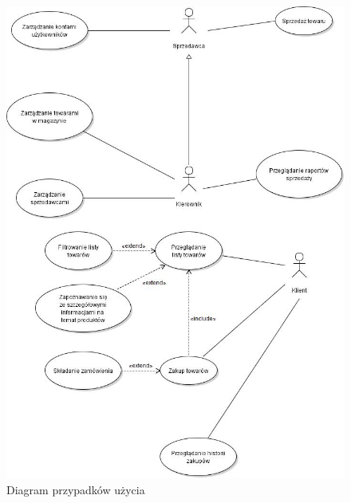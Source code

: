 \documentclass[a4paper, 12pt]{article}
\begin{document}
\begin{figure}[H]
	\includegraphics[width=13cm]{diagram_przypadkow_uzycia.jpg}
	\caption[Diagram przypadków użycia]{Diagram przypadków użycia}
	\label{fig:diagramPrzypadkowUzycia}
\end{figure}
\end{document}
